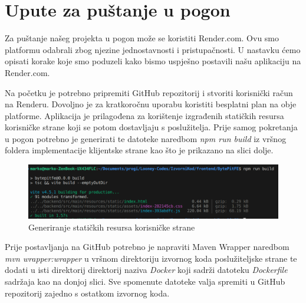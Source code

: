 \eject

\section{Upute za puštanje u pogon}

Za puštanje našeg projekta u pogon može se koristiti Render.com. Ovu smo platformu odabrali zbog njezine jednostavnosti i pristupačnosti. U nastavku ćemo opisati korake koje smo poduzeli kako bismo uspješno postavili našu aplikaciju na Render.com.


Na početku je potrebno pripremiti GitHub repozitorij i stvoriti korisnički račun na Renderu. Dovoljno je za kratkoročnu uporabu koristiti besplatni plan na obje platforme.
Aplikacija je prilagođena za korištenje izgrađenih statičkih resursa korisničke strane koji se potom dostavljaju s poslužitelja. Prije samog pokretanja u pogon potrebno je generirati te datoteke naredbom \textit{npm run build} iz vršnog foldera implementacije klijentske strane kao što je prikazano na slici dolje.

\begin{figure}[H]
	\includegraphics[scale=0.4]{slike/deployment1.png}
	\centering
	\caption{Generiranje statičkih resursa korisničke strane}
	\label{deployment1}
\end{figure}


Prije postavljanja na GitHub potrebno je napraviti Maven Wrapper naredbom \textit{mvn wrapper:wrapper} u vršnom direktoriju izvornog koda poslužiteljske strane te dodati u isti direktorij direktorij naziva \textit{Docker} koji sadrži datoteku \textit{Dockerfile} sadržaja kao na donjoj slici. Sve spomenute datoteke valja spremiti u GitHub repozitorij zajedno s ostatkom izvornog koda. 

